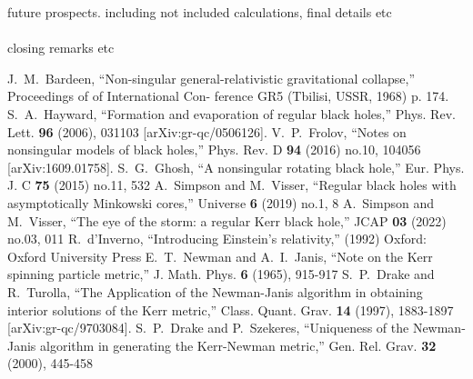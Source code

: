 \documentclass[12pt]{iopart}
\begin{document}
future prospects. including not included calculations, final details etc
\\
\\
closing remarks etc
\pagebreak







\begin{thebibliography}{99}
J.~M.~Bardeen,
``Non-singular general-relativistic gravitational collapse,''
Proceedings of of International Con-
ference GR5 (Tbilisi, USSR, 1968) p. 174.
S.~A.~Hayward,
``Formation and evaporation of regular black holes,''
Phys. Rev. Lett. \textbf{96} (2006), 031103
[arXiv:gr-qc/0506126].
V.~P.~Frolov,
``Notes on nonsingular models of black holes,''
Phys. Rev. D \textbf{94} (2016) no.10, 104056
[arXiv:1609.01758].
S.~G.~Ghosh,
``A nonsingular rotating black hole,''
Eur. Phys. J. C \textbf{75} (2015) no.11, 532
A.~Simpson and M.~Visser,
``Regular black holes with asymptotically Minkowski cores,''
Universe \textbf{6} (2019) no.1, 8
A.~Simpson and M.~Visser,
``The eye of the storm: a regular Kerr black hole,''
JCAP \textbf{03} (2022) no.03, 011
R.~d'Inverno,
``Introducing Einstein's relativity,''
(1992)
Oxford: Oxford University Press
E.~T.~Newman and A.~I.~Janis,
``Note on the Kerr spinning particle metric,''
J. Math. Phys. \textbf{6} (1965), 915-917
S.~P.~Drake and R.~Turolla,
``The Application of the Newman-Janis algorithm in obtaining interior solutions of the Kerr metric,''
Class. Quant. Grav. \textbf{14} (1997), 1883-1897
[arXiv:gr-qc/9703084].
S.~P.~Drake and P.~Szekeres,
``Uniqueness of the Newman-Janis algorithm in generating the Kerr-Newman metric,''
Gen. Rel. Grav. \textbf{32} (2000), 445-458
\end{thebibliography}
\end{document}

